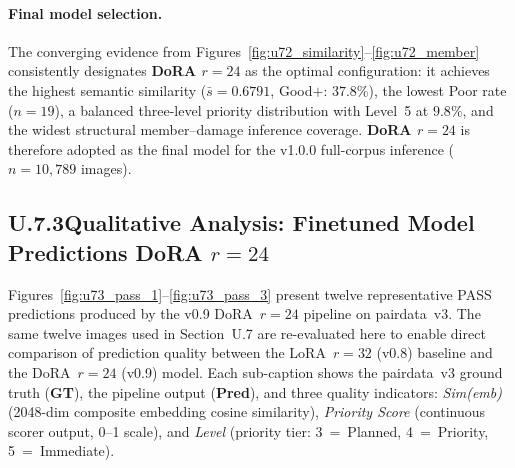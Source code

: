 \documentclass[onecolumn]{article}
\begin{document}
\paragraph{Final model selection.}
The converging evidence from Figures~\ref{fig:u72_similarity}--\ref{fig:u72_member}
consistently designates \textbf{DoRA $r{=}24$} as the optimal configuration:
it achieves the highest semantic similarity ($\bar{s}=0.6791$,
Good$+$: $37.8$\%), the lowest Poor rate ($n{=}19$),
a balanced three-level priority distribution with Level~5 at $9.8\%$,
and the widest structural member--damage inference coverage.
\textbf{DoRA $r{=}24$} is therefore adopted as the final model
for the v1.0.0 full-corpus inference ($n{=}10{,}789$ images).

\clearpage
\subsection*{U.7.3\quad Qualitative Analysis: Finetuned Model Predictions DoRA $r{=}24$}
\label{sec:u73}

Figures~\ref{fig:u73_pass_1}--\ref{fig:u73_pass_3} present twelve representative
PASS predictions produced by the v0.9 DoRA~$r{=}24$ pipeline on pairdata~v3.
The same twelve images used in Section~U.7 are re-evaluated here to enable
direct comparison of prediction quality between the LoRA~$r{=}32$ (v0.8) baseline
and the DoRA~$r{=}24$ (v0.9) model.
Each sub-caption shows the pairdata~v3 ground truth (\textbf{GT}),
the pipeline output (\textbf{Pred}),
and three quality indicators:
\textit{Sim(emb)} (2048-dim composite embedding cosine similarity),
\textit{Priority Score} (continuous scorer output, 0--1 scale), and
\textit{Level} (priority tier: 3~=~Planned, 4~=~Priority, 5~=~Immediate).
\end{document}
